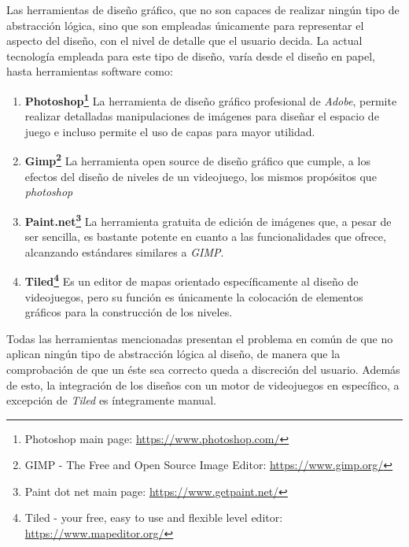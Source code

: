 Las herramientas de diseño gráfico, que no son capaces de realizar ningún tipo de abstracción lógica, sino que son empleadas únicamente para representar el aspecto del diseño, con el nivel de detalle que el usuario decida.
La actual tecnología empleada para este tipo de diseño, varía desde el diseño en papel, hasta herramientas software como:
\begin{enumerate}
	\item \textbf{Photoshop\footnote{Photoshop main page: \url{https://www.photoshop.com/}}} La herramienta de diseño gráfico profesional de \textit{Adobe}, permite realizar detalladas manipulaciones de imágenes para diseñar el espacio de juego e incluso permite el uso de capas para mayor utilidad.
	\item \textbf{Gimp\footnote{GIMP - The Free and Open Source Image Editor: \url{https://www.gimp.org/}}} La herramienta open source de diseño gráfico que cumple, a los efectos del diseño de niveles de un videojuego, los mismos propósitos que \textit{photoshop}
	\item \textbf{Paint.net\footnote{Paint dot net main page: \url{https://www.getpaint.net/}}} La herramienta gratuita de edición de imágenes que, a pesar de ser sencilla, es bastante potente en cuanto a las funcionalidades que ofrece, alcanzando estándares similares a \textit{GIMP}.
	\item \textbf{Tiled\footnote{Tiled - your free, easy to use and flexible level editor: \url{https://www.mapeditor.org/}}} Es un editor de mapas orientado específicamente al diseño de videojuegos, pero su función es únicamente la colocación de elementos gráficos para la construcción de los niveles.
\end{enumerate}
Todas las herramientas mencionadas presentan el problema en común de que no aplican ningún tipo de abstracción lógica al diseño, de manera que la comprobación de que un éste sea correcto queda a discreción del usuario.
Además de esto, la integración de los diseños con un motor de videojuegos en específico, a excepción de \textit{Tiled} es íntegramente manual.